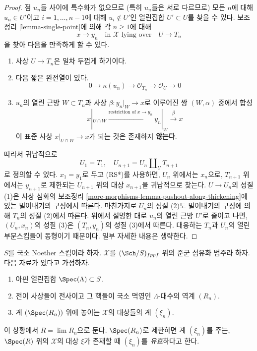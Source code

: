 \begin{proof}
점 $u_n$들 사이에 특수화가 없으므로 (특히 $u_n$들은 서로 다르므로)
모든 $n$에 대해 $u_n \in U'$이고 $i = 1, \ldots, n - 1$에 대해
$u_i \not \in U'$인 열린집합 $U' \subset U$를 찾을 수 있다.
보조정리 \ref{lemma-single-point}에 의해 각 $n \geq 1$에 대해
$$
x \to y_n
\quad\text{in }\mathcal{X}\text{ lying over}\quad
U \to T_n
$$
을 찾아 다음을 만족하게 할 수 있다.
\begin{enumerate}
\item 사상 $U \to T_n$은 일차 두껍게 하기이다.
\item 다음 짧은 완전열이 있다.
$$
0 \to \kappa(u_n) \to \mathcal{O}_{T_n} \to \mathcal{O}_U \to 0
$$
\item $u_n$의 열린 근방 $W \subset T_n$과 사상 $\beta : y_n|_W \to x$로
이루어진 쌍 $(W, \alpha)$ 중에서 합성
$$
x|_{U \cap W} \xrightarrow{\text{restriction of }x \to y_n}
y_n|_W \xrightarrow{\beta} x
$$
이 표준 사상 $x|_{U \cap W} \to x$가 되는 것은 존재하지 {\bf 않는다}.
\end{enumerate}
따라서 귀납적으로
$$
U_1 = T_1, \quad
U_{n + 1} = U_n \amalg_U T_{n + 1}
$$
로 정의할 수 있다. $x_1 = y_1$로 두고 (RS*)를 사용하면,
$U_n$ 위에서는 $x_n$으로, $T_{n + 1}$ 위에서는 $y_{n + 1}$로 제한되는
$U_{n + 1}$ 위의 대상 $x_{n + 1}$을 귀납적으로 찾는다.
$U \to U_n$의 성질 (1)은 사상 심화의 보조정리
\ref{more-morphisms-lemma-pushout-along-thickening}에 있는 밀어내기의
구성에서 따른다. 마찬가지로 $U_n$의 성질 (2)도 밀어내기의 구성에 의해
$T_n$의 성질 (2)에서 따른다. 위에서 설명한 대로 $u_n$의 열린 근방
$U'$로 줄이고 나면, $(U_n, x_n)$의 성질 (3)은 $(T_n, y_n)$의 성질
(3)에서 따른다. 대응하는 $T_n$과 $U_n$의 열린 부분스킴들이 동형이기
때문이다. 일부 자세한 내용은 생략한다.
\end{proof}

\begin{remark}[강한 유효성]
\label{remark-strong-effectiveness}
$S$를 국소 Noether 스킴이라 하자.
$\mathcal{X}$를 $(\Sch/S)_{fppf}$ 위의 준군 섬유화 범주라 하자.
다음 자료가 있다고 가정하자.
\begin{enumerate}
\item 아핀 열린집합 $\Spec(\Lambda) \subset S$.
\item 전이 사상들이 전사이고 그 핵들이 국소 멱영인
$\Lambda$-대수의 역계 $(R_n)$.
\item 계 $(\Spec(R_n))$ 위에 놓이는 $\mathcal{X}$의 대상들의 계 $(\xi_n)$.
\end{enumerate}
이 상황에서 $R = \lim R_n$으로 둔다.
$\Spec(R_n)$로 제한하면 계 $(\xi_n)$를 주는, $\Spec(R)$ 위의
$\mathcal{X}$의 대상 $\xi$가 존재할 때 $(\xi_n)$를 {\it 유효}하다고 한다.
\end{remark}


